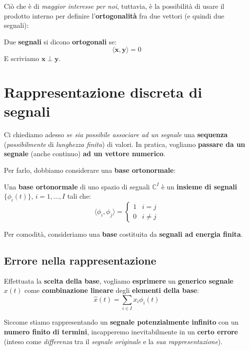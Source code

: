 Ciò che è di \textit{maggior interesse per noi}, tuttavia, è
la possibilità di usare il prodotto interno per definire
l'\textbf{ortogonalità} fra due vettori (e quindi due segnali):

\begin{definition}
    Due \textbf{segnali} si dicono \textbf{ortogonali} se:
    \[
        \langle \mathbf{x}, \mathbf{y} \rangle = 0
    \] 
    E scriviamo $\mathbf{x} \perp \mathbf{y}$.
\end{definition}

\section{Rappresentazione discreta di segnali}

Ci chiediamo adesso \textit{se sia possibile associare ad un segnale}
una \textbf{sequenza} (\textit{possibilmente} di \textit{lunghezza finita}) di valori.
In pratica, vogliamo \textbf{passare da un segnale} (anche continuo)
\textbf{ad un vettore numerico}.

Per farlo, dobbiamo considerare una \textbf{base ortonormale}:

\begin{definition}
    Una \textbf{base ortonormale} di uno spazio di segnali $\mathbb{C}^I$
    è un \textbf{insieme di segnali} $\{ \phi_i(t) \}$, $i=1,\ldots ,I$
    tali che:
    \[
        \langle \phi_i, \phi_j \rangle = \begin{cases}
            1 & i=j \\ 
            0 & i\ne j
        \end{cases}
    \] 
\end{definition}

\begin{remark}
    Per comodità, consideriamo una \textbf{base} costituita da
    \textbf{segnali ad energia finita}.
\end{remark}

\subsection{Errore nella rappresentazione}

Effettuata la \textbf{scelta della base}, vogliamo \textbf{esprimere} un
\textbf{generico segnale} $x(t)$ come \textbf{combinazione lineare}
degli \textbf{elementi della base}:
\[
    \hat{x}(t) = \sum_{i\in I} x_i \phi_i(t)
\]

\begin{remark}
    Siccome stiamo rappresentando un \textbf{segnale potenzialmente infinito}
    con un \textbf{numero finito di termini}, incapperemo inevitabilmente
    in un \textbf{certo errore} (inteso come \textit{differenza} tra il 
    \textit{segnale originale} e la \textit{sua rappresentazione}).
\end{remark}


